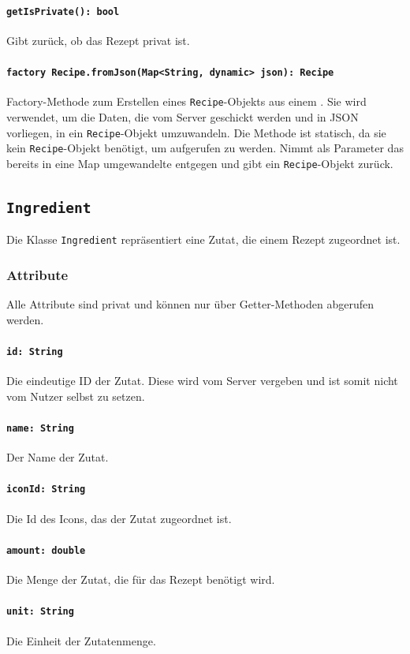\documentclass[parskip=full]{scrartcl}
\begin{document}
\paragraph{\texttt{getIsPrivate(): bool}}
Gibt zurück, ob das Rezept privat ist.
\paragraph{\texttt{factory Recipe.fromJson(Map<String, dynamic> json): Recipe}}
Factory-Methode zum Erstellen eines \texttt{Recipe}-Objekts aus einem . Sie wird verwendet, um die Daten, die vom Server geschickt werden und in \Gls{JSON} vorliegen, in ein \texttt{Recipe}-Objekt umzuwandeln. Die Methode ist statisch, da sie kein \texttt{Recipe}-Objekt benötigt, um aufgerufen zu werden. Nimmt als Parameter das bereits in eine Map umgewandelte  entgegen und gibt ein \texttt{Recipe}-Objekt zurück.

\newpage
\subsection{\texttt{Ingredient}}
Die Klasse \texttt{Ingredient} repräsentiert eine Zutat, die einem Rezept zugeordnet ist.
\subsubsection*{Attribute}
Alle Attribute sind privat und können nur über Getter-Methoden abgerufen werden.
\paragraph{\texttt{id: String}}
Die eindeutige ID der Zutat. Diese wird vom Server vergeben und ist somit nicht vom Nutzer selbst zu setzen.
\paragraph{\texttt{name: String}}
Der Name der Zutat.
\paragraph{\texttt{iconId: String}}
Die Id des Icons, das der Zutat zugeordnet ist.
\paragraph{\texttt{amount: double}}
Die Menge der Zutat, die für das Rezept benötigt wird.
\paragraph{\texttt{unit: String}}
Die Einheit der Zutatenmenge.
\end{document}
